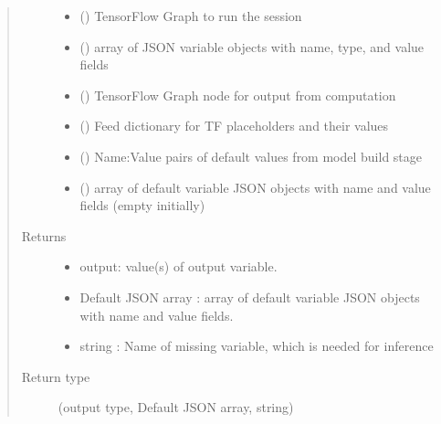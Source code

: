 \documentclass[letterpaper,10pt,english]{sphinxmanual}
\begin{document}
\begin{fulllineitems}
\begin{fulllineitems}
\begin{quote}
\begin{description}
\begin{itemize}
\item {} 
 () \textendash{} TensorFlow Graph to run the session

\item {} 
 () \textendash{} array of JSON variable objects with name, type, and value fields

\item {} 
 () \textendash{} TensorFlow Graph node for output from computation

\item {} 
 () \textendash{} Feed dictionary for TF placeholders and their values

\item {} 
 () \textendash{} Name:Value pairs of default values from model build stage

\item {} 
 () \textendash{} array of default variable JSON objects with name and value fields (empty initially)

\end{itemize}

\item[{Returns}] \leavevmode
\begin{itemize}
\item {} 
output: value(s) of output variable.

\item {} 
Default JSON array : array of default variable JSON objects with name and value fields.

\item {} 
string : Name of missing variable, which is needed for inference

\end{itemize}


\item[{Return type}] \leavevmode
(output type, Default JSON array, string)

\end{description}\end{quote}


\end{fulllineitems}
\end{fulllineitems}
\end{document}
